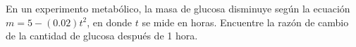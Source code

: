 \item En un experimento metabólico, la masa de glucosa disminuye según la ecuación $m = 5 - (0.02)t^2$, en donde $t$ se mide en horas. Encuentre la razón de cambio de la cantidad de glucosa después de 1 hora.
